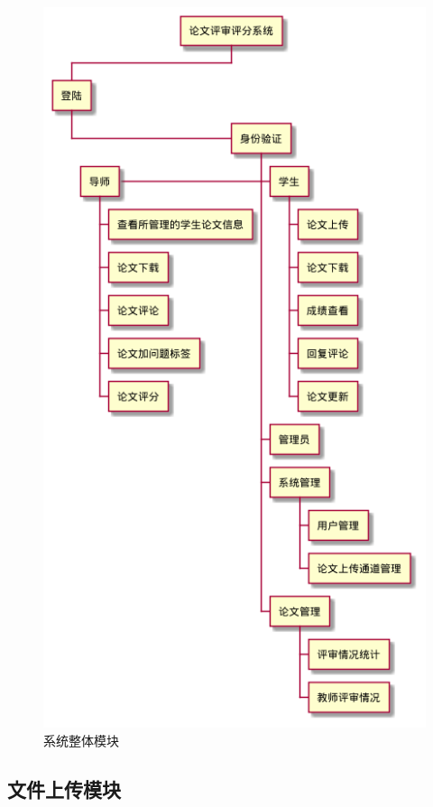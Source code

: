 \begin{figure}[ht]
    \centering
    \includegraphics[scale = 0.6]{out/uml/WBS/系统WBS/系统WBS.png}
    \caption{\song\wuhao 系统整体模块}
    \label{system-wbs}
\end{figure}

\subsection{文件上传模块}

